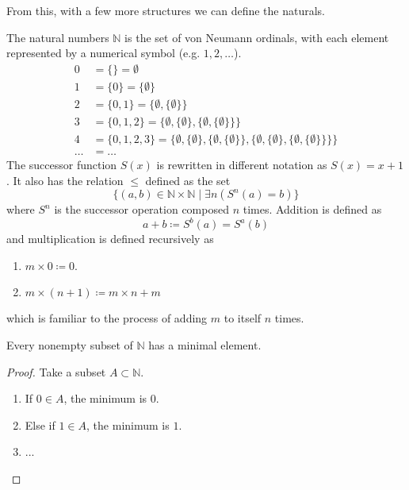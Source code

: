 \documentclass{article}
\begin{document}
    From this, with a few more structures we can define the naturals. 

    \begin{definition}
      The natural numbers $\mathbb{N}$ is the set of von Neumann ordinals, with each element represented by a numerical symbol (e.g. $1, 2, \ldots$). 
      \begin{align*}
        0 & = \{\} = \emptyset \\
        1 & = \{0\} = \{\emptyset\} \\
        2 & = \{0,1\} = \{\emptyset,\{\emptyset\}\} \\
        3 & = \{0,1,2\} = \{\emptyset,\{\emptyset\},\{\emptyset,\{\emptyset\}\}\} \\
        4 & = \{0,1,2,3\} = \{\emptyset,\{\emptyset\},\{\emptyset,\{\emptyset\}\},\{\emptyset,\{\emptyset\},\{\emptyset,\{\emptyset\}\}\}\} \\
        \ldots & = \ldots 
      \end{align*} 
      The successor function $S(x)$ is rewritten in different notation as $S(x) = x + 1$. It also has the relation $\leq$ defined as the set
      \begin{equation}
        \{ (a, b) \in \mathbb{N} \times \mathbb{N} \mid \exists n (S^n(a) = b )\}
      \end{equation}
      where $S^n$ is the successor operation composed $n$ times. Addition is defined as 
      \begin{equation}
        a + b \coloneqq S^b (a) = S^a (b)
      \end{equation}
      and multiplication is defined recursively as 
      \begin{enumerate}
        \item $m \times 0 \coloneqq 0$. 
        \item $m \times (n + 1) \coloneqq m \times n + m$
      \end{enumerate}
      which is familiar to the process of adding $m$ to itself $n$ times. 
    \end{definition}

    \begin{lemma}
      Every nonempty subset of $\mathbb{N}$ has a minimal element. 
    \end{lemma} 
    \begin{proof}
      Take a subset $A \subset \mathbb{N}$. 
      \begin{enumerate}
        \item If $0 \in A$, the minimum is $0$. 
        \item Else if $1 \in A$, the minimum is $1$. 
        \item ...
      \end{enumerate} 
    \end{proof}
\end{document}
